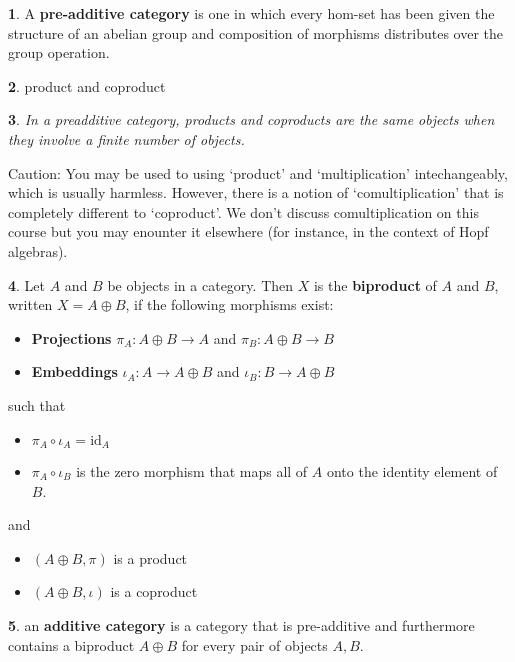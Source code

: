 \documentclass[oneside,english]{amsbook}
\numberwithin{section}{chapter}
\theoremstyle{plain}
\newtheorem{thm}{\protect\theoremname}
\theoremstyle{definition}
\newtheorem{defn}[thm]{\protect\definitionname}
\providecommand{\definitionname}{Definition}
\providecommand{\theoremname}{Theorem}
\begin{document}
			\begin{defn}
				A \textbf{pre-additive category} is one in which every hom-set has been given the structure of an abelian group and composition of morphisms distributes over the group operation.				
			\end{defn}

			\begin{defn}
				product and coproduct
			\end{defn}
			
			\begin{thm}
				In a preadditive category, products and coproducts are the same objects when they involve a finite number of objects.
			\end{thm}
			
			Caution: You may be used to using `product' and `multiplication' intechangeably, which is usually harmless. However, there is a notion of `comultiplication' that is completely different to `coproduct'. We don't discuss comultiplication on this course but you may enounter it elsewhere (for instance, in the context of Hopf algebras).
			
			\begin{defn}
				Let $A$ and $B$ be objects in a category. Then $X$ is the \textbf{biproduct} of $A$ and $B$, written $X = A\oplus B$, if the following morphisms exist:
				\begin{itemize}
					\item \textbf{Projections} $\pi_A: A\oplus B\to A$ and $\pi_B: A\oplus B\to B$ 
					\item \textbf{Embeddings} $\iota_A: A\to A\oplus B$ and $\iota_B: B\to A\oplus B$ 
				\end{itemize}
				such that
				\begin{itemize}
					\item $\pi_A\circ\iota_A = \text{id}_A$
					\item $\pi_A\circ\iota_B$ is the zero morphism that maps all of $A$ onto the identity element of $B$.
				\end{itemize}
				and
				\begin{itemize}
					\item $(A\oplus B, \pi)$ is a product
					\item $(A\oplus B, \iota)$ is a coproduct
				\end{itemize}
			\end{defn}
			
			\begin{defn}
				an \textbf{additive category} is a category that is pre-additive and furthermore contains a biproduct $A\oplus B$ for every pair of objects $A, B$.
			\end{defn}
\end{document}
